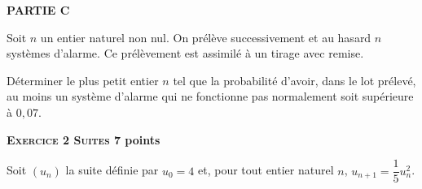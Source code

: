 \documentclass[10pt,a4paper]{article}
\begin{document}
\medskip

\textbf{PARTIE C}

\medskip

Soit $n$ un entier naturel non nul. On prélève successivement et au hasard $n$ systèmes d'alarme. Ce prélèvement est assimilé à un tirage avec remise.

Déterminer le plus petit entier $n$ tel que la probabilité d'avoir, dans le lot prélevé, au moins un système d'alarme qui ne fonctionne pas normalement soit supérieure à $0,07$.

\bigskip

\textbf{\textsc{Exercice 2 Suites} \hfill 7 points}

\medskip

Soit $\left(u_n\right)$ la suite définie par $u_0 = 4$ et, pour tout entier naturel $n$,\: $u_{n+1} = \dfrac15 u_n^2$.

\medskip
\end{document}
